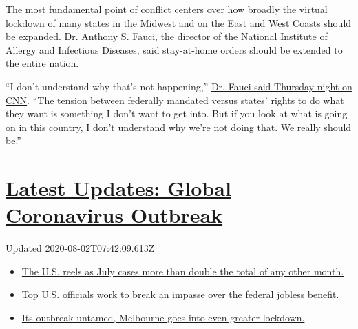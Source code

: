 The most fundamental point of conflict centers over how broadly the
virtual lockdown of many states in the Midwest and on the East and West
Coasts should be expanded. Dr. Anthony S. Fauci, the director of the
National Institute of Allergy and Infectious Diseases, said stay-at-home
orders should be extended to the entire nation.

``I don't understand why that's not happening,''
\href{https://www.cnn.com/2020/04/02/politics/fauci-stay-home-coronavirus-states-cnntv/index.html}{Dr.
Fauci said Thursday night on CNN}. ``The tension between federally
mandated versus states' rights to do what they want is something I don't
want to get into. But if you look at what is going on in this country, I
don't understand why we're not doing that. We really should be.''

\hypertarget{latest-updates-global-coronavirus-outbreak}{%
\section{\texorpdfstring{\href{https://www.nytimes.com/2020/08/01/world/coronavirus-covid-19.html?action=click\&pgtype=Article\&state=default\&region=MAIN_CONTENT_1\&context=storylines_live_updates}{Latest
Updates: Global Coronavirus
Outbreak}}{Latest Updates: Global Coronavirus Outbreak}}\label{latest-updates-global-coronavirus-outbreak}}

Updated 2020-08-02T07:42:09.613Z

\begin{itemize}
\tightlist
\item
  \href{https://www.nytimes.com/2020/08/01/world/coronavirus-covid-19.html?action=click\&pgtype=Article\&state=default\&region=MAIN_CONTENT_1\&context=storylines_live_updates\#link-34047410}{The
  U.S. reels as July cases more than double the total of any other
  month.}
\item
  \href{https://www.nytimes.com/2020/08/01/world/coronavirus-covid-19.html?action=click\&pgtype=Article\&state=default\&region=MAIN_CONTENT_1\&context=storylines_live_updates\#link-780ec966}{Top
  U.S. officials work to break an impasse over the federal jobless
  benefit.}
\item
  \href{https://www.nytimes.com/2020/08/01/world/coronavirus-covid-19.html?action=click\&pgtype=Article\&state=default\&region=MAIN_CONTENT_1\&context=storylines_live_updates\#link-2bc8948}{Its
  outbreak untamed, Melbourne goes into even greater lockdown.}
\end{itemize}

